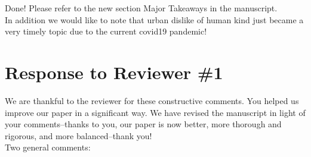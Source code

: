 Done! Please refer to the new section Major Takeaways in the manuscript.\\ 

In addition we would like to note that urban dislike of human kind just became a
very timely topic due to the current covid19 pandemic!










 
\newpage
\section{Response to Reviewer \#1} 

We are thankful to the reviewer for these constructive comments. You helped us improve our paper in a significant way. We have revised the manuscript in light of your comments--thanks to you, our paper is now better, more thorough and rigorous, and more balanced--thank you!\\


Two general comments:

